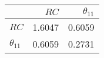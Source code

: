 \begin{tabular}{lrr}
\toprule
{} &    $RC$ &  $\theta_{11}$ \\
\midrule
$RC$          &  1.6047 &         0.6059 \\
$\theta_{11}$ &  0.6059 &         0.2731 \\
\bottomrule
\end{tabular}
